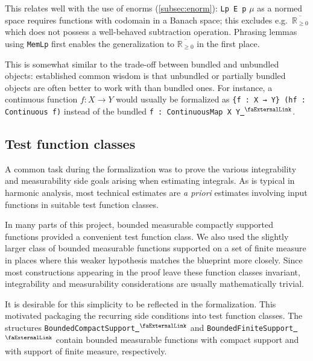 \documentclass[12pt]{amsart}
\newcommand{\lean}[1]{\lstinline{#1}}
\newcommand{\mlean}[1]{\mathtt{\ #1\ }}
\newcommand*{\real}{\mathbb{R}} %
\newcommand{\ennreal}{\overline{\real_{\ge0}}}
\newcommand{\extlink}{~\ensuremath{{}^\text{\faExternalLink}}}
\theoremstyle{definition}
\theoremstyle{plain}
\begin{document}
This relates well with the use of enorms (\ref{subsec:enorm}): \texttt{Lp E p} $\mathtt{\mu}$ as a normed space requires functions with codomain in a Banach space; this excludes e.g.\ $\ennreal$ which does not possess a well-behaved subtraction operation. Phrasing lemmas using \lean{MemLp} first enables the generalization to $\ennreal$ in the first place.

This is somewhat similar to the trade-off between bundled and unbundled objects: established common wisdom is that unbundled or partially bundled objects are often better to work with than bundled ones. For instance, a continuous function $f\colon X \to Y$ would usually be formalized as \lstinline|{f : X → Y} (hf : Continuous f)| instead of the bundled \lean{f : ContinuousMap X Y}\href{https://github.com/leanprover-community/mathlib4/blob/81a5d257c8e410db227a6665ed08f64fea08e997/Mathlib/Topology/ContinuousMap/Defs.lean#L33}{\extlink}.

\subsection{Test function classes}\label{subsec:bdd_comp_supp}
A common task during the formalization was to prove the various integrability and measurability side goals
arising when estimating integrals.
As is typical in harmonic analysis, most technical estimates are {\it a priori} estimates involving
input functions in suitable test function classes.

In many parts of this project, bounded measurable compactly supported functions provided a convenient
test function class. We also used the slightly larger class
of bounded measurable functions supported on a set of finite measure in places where this weaker hypothesis
matches the blueprint more closely.
Since most constructions appearing in the proof leave these function classes invariant,
integrability and measurability considerations are usually mathematically trivial.

It is desirable for this simplicity to be reflected in the formalization.
This motivated packaging the recurring side conditions into test function classes.
The structures \lean{BoundedCompactSupport}\href{https://github.com/fpvandoorn/carleson/blob/f2f614db47f1a30e3fceaa9c2e1f99ff356dd577/Carleson/ToMathlib/BoundedCompactSupport.lean#L81}{\extlink} and \lean{BoundedFiniteSupport}\href{https://github.com/fpvandoorn/carleson/blob/020d6e5c71d731952eb0379d222eea4049103ca0/Carleson/Defs.lean#L74}{\extlink}
contain bounded measurable functions with compact support and with support of finite measure, respectively.
\end{document}
